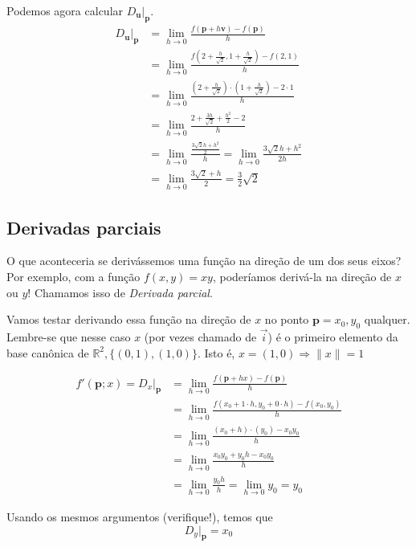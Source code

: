 \documentclass[
  letterpaper,
  DIV=11,
  numbers=noendperiod]{scrreprt}
\begin{document}
Podemos agora calcular \(D_{\pmb{u}}\rvert_{\pmb{p}}\). \[
\begin{aligned}
D_{\pmb{u}}\rvert_{\pmb{p}} &= \lim_{h \rightarrow 0}
\frac{f(\pmb{p} + h\pmb{v})-f(\pmb{p})}{h} \\
&= \lim_{h\rightarrow 0} \frac{f\left(2+\frac{h}{\sqrt{2}},1+\frac{h}{\sqrt{2}}\right)-f(2,1)}{h} \\
& = \lim_{h\rightarrow 0} \frac{\left(2+\frac{h}{\sqrt{2}}\right)\cdot\left(1+\frac{h}{\sqrt{2}}\right) - 2\cdot 1}{h} \\
&= \lim_{h\rightarrow 0} \frac{2 + \frac{3h}{\sqrt{2}} + \frac{h^2}{2} - 2}{h} \\
& = \lim_{h\rightarrow 0} \frac{\frac{3\sqrt{2}h + h^2}{2}}{h} =
\lim_{h\rightarrow 0} \frac{3\sqrt{2}h+h^2}{2h}\\
&= \lim_{h\rightarrow 0} \frac{3\sqrt{2} + h}{2} = \frac{3}{2}\sqrt{2}
\end{aligned}
\]

\subsection{Derivadas parciais}\label{derivadas-parciais}

O que aconteceria se derivássemos uma função na direção de um dos seus
eixos? Por exemplo, com a função \(f(x,y) = xy\), poderíamos derivá-la
na direção de \(x\) ou \(y\)! Chamamos isso de \emph{Derivada parcial}.

Vamos testar derivando essa função na direção de \(x\) no ponto
\(\pmb{p} = x_0, y_0\) qualquer. Lembre-se que nesse caso \(x\) (por
vezes chamado de \(\vec{i}\)) é o primeiro elemento da base canônica de
\(\mathbb{R}^2, \{(0,1),(1,0)\}\). Isto é,
\(x = (1,0) \Rightarrow \lVert x \rVert = 1\)

\[
\begin{aligned}
  f'(\pmb{p}; x) = D_{x}\rvert_{\pmb{p}} 
  &= \lim_{h \rightarrow 0} \frac{f(\pmb{p} + hx) - f(\pmb{p})}{h} \\
  &= \lim_{h\rightarrow 0} \frac{f(x_0 + 1 \cdot h, y_0 + 0 \cdot h) - f(x_0,y_0)}{h} \\
  &= \lim_{h\rightarrow 0} \frac{(x_0+h)\cdot(y_0) - x_{0}y_0}{h} \\
  &= \lim_{h\rightarrow 0} \frac{x_0y_0 + y_0h - x_0y_0}{h} \\
  &= \lim_{h\rightarrow 0} \frac{y_0h}{h} = \lim_{h\rightarrow 0} y_0  = y_0
\end{aligned}
\]

Usando os mesmos argumentos (verifique!), temos que \[
D_{y}\rvert_{\pmb{p}} = x_0
\]
\end{document}
